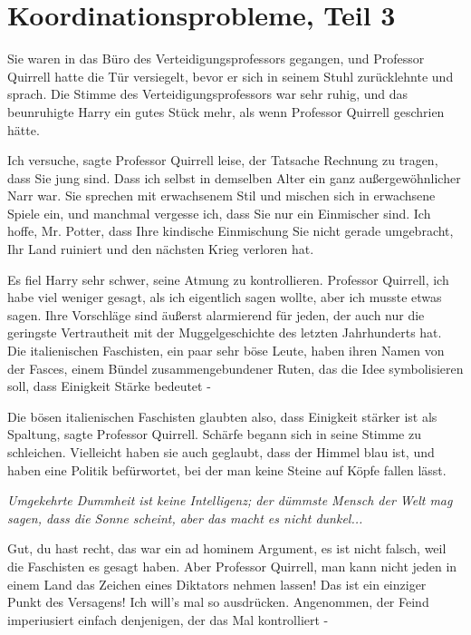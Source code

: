 \chapter{Koordinationsprobleme, Teil 3}

Sie waren in das Büro des Verteidigungsprofessors gegangen, und Professor
Quirrell hatte die Tür versiegelt, bevor er sich in seinem Stuhl zurücklehnte
und sprach. Die Stimme des Verteidigungsprofessors war sehr ruhig, und das
beunruhigte Harry ein gutes Stück mehr, als wenn Professor Quirrell geschrien
hätte.

\glqq{}Ich versuche\grqq{}, sagte Professor Quirrell leise, \glqq{}der Tatsache
Rechnung zu tragen, dass Sie jung sind. Dass ich selbst in demselben Alter ein
ganz außergewöhnlicher Narr war. Sie sprechen mit erwachsenem Stil und mischen
sich in erwachsene Spiele ein, und manchmal vergesse ich, dass Sie nur ein
Einmischer sind. Ich hoffe, Mr. Potter, dass Ihre kindische Einmischung Sie
nicht gerade umgebracht, Ihr Land ruiniert und den nächsten Krieg verloren hat.\grqq{}

Es fiel Harry sehr schwer, seine Atmung zu kontrollieren. \glqq{}Professor
Quirrell, ich habe viel weniger gesagt, als ich eigentlich sagen wollte, aber
ich musste etwas sagen. Ihre Vorschläge sind äußerst alarmierend für jeden, der
auch nur die geringste Vertrautheit mit der Muggelgeschichte des letzten
Jahrhunderts hat. Die italienischen Faschisten, ein paar sehr böse Leute, haben
ihren Namen von der Fasces, einem Bündel zusammengebundener Ruten, das die Idee
symbolisieren soll, dass Einigkeit Stärke bedeutet -\grqq{}

\glqq{}Die bösen italienischen Faschisten glaubten also, dass Einigkeit stärker
ist als Spaltung\grqq{}, sagte Professor Quirrell. Schärfe begann sich in seine
Stimme zu schleichen. \glqq{}Vielleicht haben sie auch geglaubt, dass der Himmel
blau ist, und haben eine Politik befürwortet, bei der man keine Steine auf Köpfe
fallen lässt.\grqq{}

\emph{Umgekehrte Dummheit ist keine Intelligenz; der dümmste Mensch der Welt
mag sagen, dass die Sonne scheint, aber das macht es nicht dunkel...}

\glqq{}Gut, du hast recht, das war ein ad hominem Argument, es ist nicht falsch,
weil die Faschisten es gesagt haben. Aber Professor Quirrell, man kann nicht
jeden in einem Land das Zeichen eines Diktators nehmen lassen! Das ist ein
einziger Punkt des Versagens! Ich will's mal so ausdrücken. Angenommen, der
Feind imperiusiert einfach denjenigen, der das Mal kontrolliert -\grqq{}

